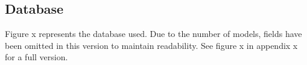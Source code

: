 \subsection{Database}
Figure x represents the database used. Due to the number of models, fields have been omitted in this version to maintain readability. See figure x in appendix x for a full version.